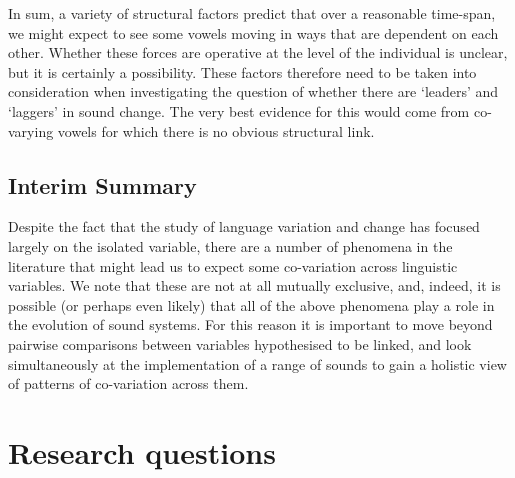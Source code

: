 \documentclass[review]{elsarticle} %
\begin{document}
In sum, a variety of structural factors predict that over a reasonable time-span, we might expect to see some vowels moving in ways that are dependent on each other. Whether these forces are operative at the level of the individual is unclear, but it is certainly a possibility.  These factors therefore need to be taken into consideration when investigating the question of whether there are `leaders' and `laggers' in sound change.  The very best evidence for this would come from co-varying vowels for which there is no obvious structural link.

\subsection{Interim Summary}
Despite the fact that the study of language variation and change has focused largely on the isolated variable, there are a number of phenomena in the literature that might lead us to expect some co-variation across linguistic variables.  We note that these are not at all mutually exclusive, and, indeed, it is possible (or perhaps even likely) that all of the above phenomena play a role in the evolution of sound systems.   For this reason it is important to move beyond pairwise comparisons between variables hypothesised to be linked, and look simultaneously at the implementation of a range of sounds to gain a holistic view of patterns of co-variation across them.

\section{Research questions}
\label{sec:researchquestions}
\end{document}

